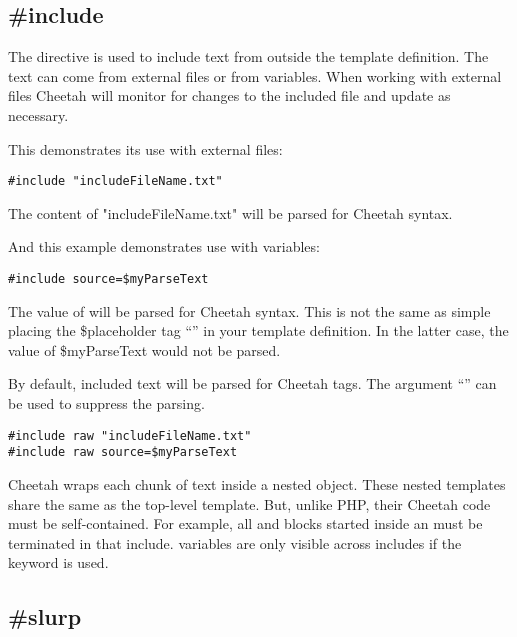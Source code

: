 \subsection{\#include}
\label{output.include}

The  directive is  used to include text from outside the
template definition.  The text can come from external files or from
 variables.  When working with external files Cheetah will
monitor for changes to the included file and update as necessary.  

This demonstrates its use with external files:
\begin{verbatim}
#include "includeFileName.txt"
\end{verbatim}
The content of "includeFileName.txt" will be parsed for Cheetah syntax.

And this example demonstrates use with  variables:
\begin{verbatim}
#include source=$myParseText
\end{verbatim}
The value of  will be parsed for Cheetah syntax. This is not
the same as simple placing the \$placeholder tag ``'' in
your template definition.  In the latter case, the value of \$myParseText would
not be parsed.

By default, included text will be parsed for Cheetah tags.  The argument
``'' can be used to suppress the parsing.

\begin{verbatim}
#include raw "includeFileName.txt"
#include raw source=$myParseText
\end{verbatim}

Cheetah wraps each chunk of  text inside a nested
 object.  These nested templates share the same 
as the top-level template. But, unlike PHP, their Cheetah code must be
self-contained.  For example, all  and  blocks started
inside an  must be terminated in that include. 
variables are only visible across includes if the  keyword is
used.


\subsection{\#slurp}
\label{output.slurp}

